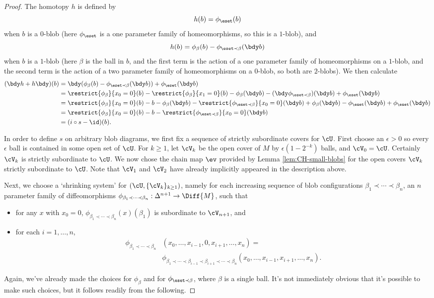 \begin{proof}
The homotopy $h$ is defined by $$h(b) = \phi_\eset(b)$$ when $b$ is a $0$-blob (here $\phi_\eset$ is a one parameter family of homeomorphisms, so this is a $1$-blob), and $$h(b) = \phi_\beta(b) - \phi_{\eset \prec \beta}(\bdy b)$$ when $b$ is a $1$-blob (here $\beta$ is the ball in $b$, and the first term is the action of a one parameter family of homeomorphisms on a $1$-blob, and the second term is the action of a two parameter family of homeomorphisms on a $0$-blob, so both are $2$-blobs). We then calculate
\begin{align*}
(\bdy h+h \bdy)(b) & = \bdy (\phi_{\beta}(b) - \phi_{\eset \prec \beta}(\bdy b)) + \phi_\eset(\bdy b)  \\
	& =  \restrict{\phi_\beta}{x_0=0}(b) - \restrict{\phi_\beta}{x_1=0}(b) - \phi_\beta(\bdy b) - (\bdy \phi_{\eset \prec \beta})(\bdy b) + \phi_\eset(\bdy b) \\
	& =  \restrict{\phi_\beta}{x_0=0}(b) - b - \phi_\beta(\bdy b) - \restrict{\phi_{\eset \prec \beta}}{x_0=0}(\bdy b) +  \phi_\beta(\bdy b) - \phi_\eset(\bdy b) + \phi_\eset(\bdy b) \\
	& = \restrict{\phi_\beta}{x_0=0}(b) - b - \restrict{\phi_{\eset \prec \beta}}{x_0=0}(\bdy b) \\
	& = (i \circ s - \id)(b).
\end{align*}


In order to define $s$ on arbitrary blob diagrams, we first fix a sequence of strictly subordinate covers for $\cU$. First choose an $\epsilon > 0$ so every $\epsilon$ ball is contained in some open set of $\cU$. For $k \geq 1$, let $\cV_{k}$ be the open cover of $M$ by $\epsilon (1-2^{-k})$ balls, and $\cV_0 = \cU$. Certainly $\cV_k$ is strictly subordinate to $\cU$. We now chose the chain map $\ev$ provided by Lemma \ref{lem:CH-small-blobs} for the open covers $\cV_k$ strictly subordinate to $\cU$. Note that $\cV_1$ and $\cV_2$ have already implicitly appeared in the description above.

Next, we choose a `shrinking system' for $\left(\cU,\{\cV_k\}_{k \geq 1}\right)$, namely for each increasing sequence of blob configurations
$\beta_1 \prec \cdots \prec \beta_n$, an $n$ parameter family of diffeomorphisms
$\phi_{\beta_1 \prec \cdots \prec \beta_n} : \Delta^{n+1} \to \Diff{M}$, such that
\begin{itemize}
\item for any $x$ with $x_0 = 0$, $\phi_{\beta_1 \prec \cdots \prec \beta_n}(x)(\beta_1)$ is subordinate to $\cV_{n+1}$, and
\item for each $i = 1, \ldots, n$,
\begin{align*}
\phi_{\beta_1 \prec \cdots \prec \beta_n}&(x_0, \ldots, x_{i-1},0,x_{i+1},\ldots,x_n) = \\ &\phi_{\beta_1 \prec \cdots \prec \beta_{i-1} \prec \beta_{i+1} \prec \cdots \prec \beta_n}(x_0,\ldots, x_{i-1},x_{i+1},\ldots,x_n).
\end{align*}
\end{itemize}
Again, we've already made the choices for $\phi_{\beta}$ and for $\phi_{\eset \prec \beta}$, where $\beta$ is a single ball. It's not immediately obvious that it's possible to make such choices, but it follows readily from the following.


\end{proof}
